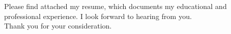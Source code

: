 \noindent Please find attached my resume, which documents my educational and professional experience. I look forward to hearing from you.
\\

\noindent Thank you for your consideration.
\\

\\

